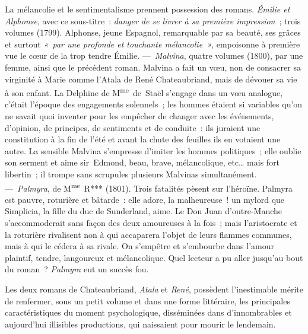 \documentclass[french,twoside]{book} %
\begin{document}
La mélancolie et le sentimentalisme prennent possession des romans. \emph{Émilie et Alphonse}, avec ce sous-titre : \emph{danger de se livrer à sa première impression} ; trois volumes (1799). Alphonse, jeune Espagnol, remarquable par sa beauté, ses grâces et surtout \emph{« par une profonde et touchante mélancolie »}, empoisonne à première vue le cœur de la trop tendre Émilie. — \emph{Malvina}, quatre volumes (1800), par une femme, ainsi que le précédent roman. Malvina a fait un vœu, non de consacrer sa virginité à Marie comme l’Atala de René Chateaubriand, mais de dévouer sa vie à son enfant. La Delphine de M\textsuperscript{me} de Staël s’engage dans un vœu analogue, c’était l’époque des engagements solennels ; les hommes étaient si variables qu’on ne savait quoi inventer pour les empêcher de changer avec les événements, d’opinion, de principes, de sentiments et de conduite : ils juraient une constitution à la fin de l’été et avant la chute des feuilles ils en votaient une autre. La sensible Malvina s’empresse d’imiter les hommes politiques ; elle oublie son serment et aime sir Edmond, beau, brave, mélancolique, etc… mais fort libertin ; il trompe sans scrupules plusieurs Malvinas simultanément. — \emph{Palmyra}, de M\textsuperscript{me} R*** (1801). Trois fatalités pèsent sur l’héroïne. Palmyra est pauvre, roturière et bâtarde : elle adore, la malheureuse ! un mylord que Simplicia, la fille du duc de Sunderland, aime. Le Don Juan d’outre-Manche s’accommoderait sans façon des deux amoureuses à la fois ; mais l’aristocrate et la roturière rivalisent non à qui accaparera l’objet de leurs flammes communes, mais à qui le cédera à sa rivale. On s’empêtre et s’embourbe dans l’amour plaintif, tendre, langoureux et mélancolique. Quel lecteur a pu aller jusqu’au bout du roman ? \emph{Palmyra} eut un succès fou.\par
Les deux romans de Chateaubriand, \emph{Atala} et \emph{René}, possèdent l’inestimable mérite de renfermer, sous un petit volume et dans une forme littéraire, les principales caractéristiques du moment psychologique, disséminées dans d’innombrables et aujourd’hui illisibles productions, qui naissaient pour mourir le lendemain.\par
\end{document}
